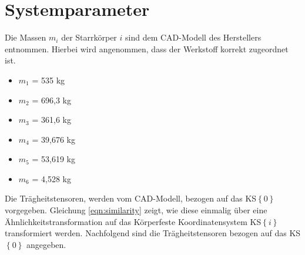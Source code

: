 \section{Systemparameter}
\label{add:Systemparameterdef}
Die Massen $m_i$ der Starrkörper $i$ sind dem CAD-Modell des Herstellers entnommen. Hierbei wird angenommen, dass der Werkstoff korrekt zugeordnet ist. 
%
\begin{itemize}
	\item $m_1$ = 535 kg
	\item $m_2$ = 696,3 kg
	\item $m_3$ = 361,6 kg
	\item $m_4$ = 39,676 kg
	\item $m_5$ = 53,619 kg
	\item $m_6$ = 4,528 kg
\end{itemize}
%
Die Trägheitstensoren, werden vom CAD-Modell, bezogen auf das KS$\left\{0\right\}$ vorgegeben. Gleichung \ref{eqn:similarity} zeigt, wie diese einmalig über eine Ähnlichkeitstransformation auf das Körperfeste Koordinatensystem KS$\left\{i\right\}$ transformiert werden. Nachfolgend sind die Trägheitstensoren bezogen auf das KS$\left\{0\right\}$ angegeben. 
%
